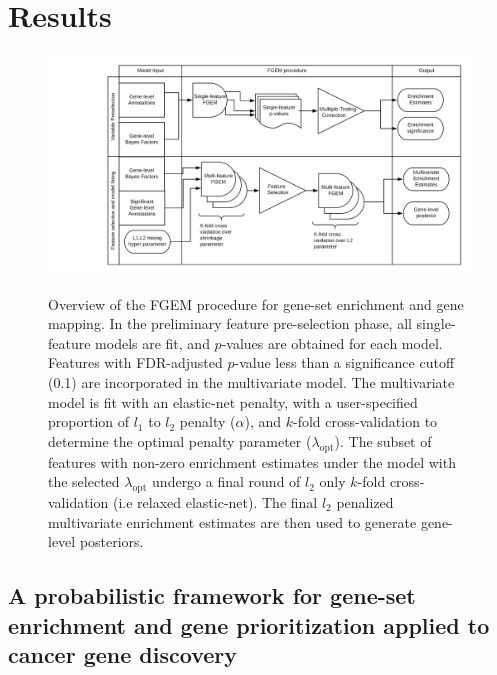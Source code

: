 \section{Results}\label{sec:org6fb4837}

\begin{figure}[h]
  \centering
  \includegraphics[width=.9\linewidth]{img/FGEM_procedure.png}\label{fig:overview}
  \caption{Overview of the FGEM procedure for gene-set enrichment and gene mapping.  In the preliminary feature pre-selection phase, all single-feature models are fit, and $p$-values are obtained for each model.
    Features with FDR-adjusted $p$-value less than a significance cutoff (0.1) are incorporated in the multivariate model. The multivariate model is fit with an elastic-net penalty, with a user-specified proportion of $l_1$
    to $l_2$ penalty ($\alpha$), and $k$-fold cross-validation to determine the optimal penalty parameter ($\lambda_{\text{opt}}$).  The subset of features with non-zero enrichment estimates under the model with the selected $\lambda_{\text{opt}}$ undergo a final round of $l_2$ only $k$-fold cross-validation (i.e relaxed elastic-net).  The final $l_2$ penalized multivariate enrichment estimates are then used to generate gene-level posteriors. }
\end{figure}


\subsection{A probabilistic framework for gene-set enrichment and gene prioritization applied to cancer gene discovery}\label{sec:org2d4ff20}

